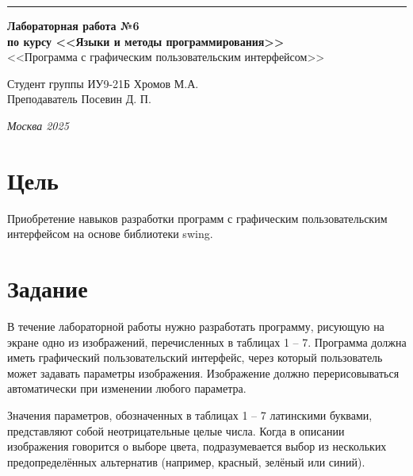 \documentclass[a4paper, 14pt]{extarticle}
\begin{document}
\begin{titlepage}
\vspace*{-16pt}
\hspace{30pt}\rule{0.866\textwidth}{0.4pt}
  
\vspace{11em}

\begin{center}
\Large {\bf Лабораторная работа №6 } \\ 
\large {\bf по курсу <<Языки и методы программирования>>} \\ 
\large <<Программа с графическим пользовательским интерфейсом>>
\end{center}\normalsize

\vspace{8em}


\begin{flushright}
  {Студент группы ИУ9-21Б Хромов М.А.\hspace*{15pt} \\
  \vspace{2ex}
  Преподаватель Посевин Д. П.\hspace*{15pt}}
\end{flushright}

\bigskip

\vfill
 

\begin{center}
\textsl{Москва 2025}
\end{center}
\end{titlepage}

\renewcommand{\ttdefault}{pcr}

\setlength{\tabcolsep}{3pt}
\newpage
\section{Цель}\label{Sect::task}
\par
Приобретение навыков разработки программ с графическим пользовательским интерфейсом на основе библиотеки swing.
	
 

\section{Задание}\label{Sect::task}
\par
В течение лабораторной работы нужно разработать программу, рисующую на экране одно из изображений, перечисленных в таблицах 1 – 7. Программа должна иметь графический пользовательский интерфейс, через который пользователь может задавать параметры изображения. Изображение должно перерисовываться автоматически при изменении любого параметра.
\par
Значения параметров, обозначенных в таблицах 1 – 7 латинскими буквами, представляют собой неотрицательные целые числа. Когда в описании изображения говорится о выборе цвета, подразумевается выбор из нескольких предопределённых альтернатив (например, красный, зелёный или синий).
\end{document}
